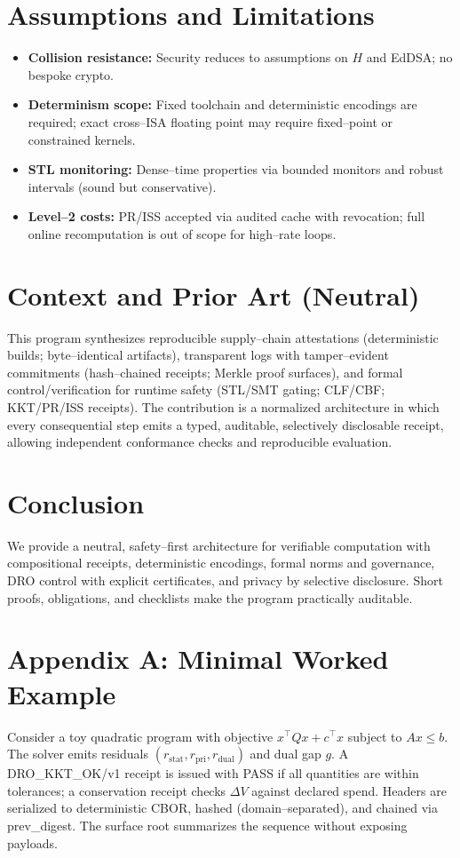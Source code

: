 \documentclass[11pt]{article}
\theoremstyle{plain}
\theoremstyle{definition}
\theoremstyle{remark}
\def\texttt#1{#1}%
\def\textsc#1{#1}%
\newcommand{\SC}[1]{\textsc{#1}}
\newcommand{\code}[1]{\texttt{#1}}
\begin{document}
\section{Assumptions and Limitations}
\begin{itemize}
  \item \textbf{Collision resistance:} Security reduces to assumptions on $H$ and EdDSA; no bespoke crypto.
  \item \textbf{Determinism scope:} Fixed toolchain and deterministic encodings are required; exact cross--ISA floating point may require fixed--point or constrained kernels.
  \item \textbf{STL monitoring:} Dense--time properties via bounded monitors and robust intervals (sound but conservative).
  \item \textbf{Level--2 costs:} PR/ISS accepted via audited cache with revocation; full online recomputation is out of scope for high--rate loops.
\end{itemize}

\section{Context and Prior Art (Neutral)}
This program synthesizes reproducible supply--chain attestations (deterministic builds; byte--identical artifacts), transparent logs with tamper--evident commitments (hash--chained receipts; Merkle proof surfaces), and formal control/verification for runtime safety (STL/SMT gating; CLF/CBF; KKT/PR/ISS receipts). The contribution is a normalized architecture in which every consequential step emits a typed, auditable, selectively disclosable receipt, allowing independent conformance checks and reproducible evaluation.

\section{Conclusion}
We provide a neutral, safety--first architecture for verifiable computation with compositional receipts, deterministic encodings, formal norms and governance, DRO control with explicit certificates, and privacy by selective disclosure. Short proofs, obligations, and checklists make the program practically auditable.

\appendix
\section*{Appendix A: Minimal Worked Example}
Consider a toy quadratic program with objective $x^\top Q x + c^\top x$ subject to $Ax\leq b$. The solver emits residuals $(r_{\mathrm{stat}}, r_{\mathrm{pri}}, r_{\mathrm{dual}})$ and dual gap $g$. A \SC{DRO\_KKT\_OK/v1} receipt is issued with PASS if all quantities are within tolerances; a conservation receipt checks $\Delta V$ against declared spend. Headers are serialized to deterministic CBOR, hashed (domain--separated), and chained via \code{prev\_digest}. The surface root summarizes the sequence without exposing payloads.
\end{document}
